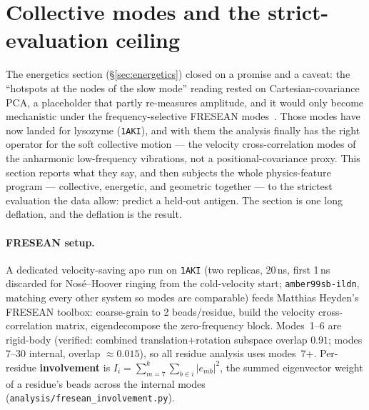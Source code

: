 \section{Collective modes and the strict-evaluation ceiling}\label{sec:modes}

The energetics section (\S\ref{sec:energetics}) closed on a promise and a caveat: the ``hotspots at
the nodes of the slow mode'' reading rested on Cartesian-covariance PCA, a placeholder that partly
re-measures amplitude, and it would only become mechanistic under the frequency-selective FRESEAN
modes~\cite{fresean2023,fastsampling2024}. Those modes have now landed for lysozyme (\texttt{1AKI}), and with them
the analysis finally has the right operator for the soft collective motion --- the velocity
cross-correlation modes of the anharmonic low-frequency vibrations, not a positional-covariance proxy.
This section reports what they say, and then subjects the whole physics-feature program --- collective,
energetic, and geometric together --- to the strictest evaluation the data allow: predict a held-out
antigen. The section is one long deflation, and the deflation is the result.

\paragraph{FRESEAN setup.} A dedicated velocity-saving apo run on \texttt{1AKI} (two replicas, 20\,ns,
first 1\,ns discarded for Nos\'e--Hoover ringing from the cold-velocity start; \texttt{amber99sb-ildn},
matching every other system so modes are comparable) feeds Matthias Heyden's FRESEAN toolbox: coarse-grain
to 2 beads/residue, build the velocity cross-correlation matrix, eigendecompose the zero-frequency block.
Modes~1--6 are rigid-body (verified: combined translation$+$rotation subspace overlap $0.91$; modes 7--30
internal, overlap $\approx0.015$), so all residue analysis uses modes~7+. Per-residue \textbf{involvement}
is $I_i=\sum_{m=7}^{k}\sum_{b\in i}|e_{mb}|^2$, the summed eigenvector weight of a residue's beads across
the internal modes (\texttt{analysis/fresean\_involvement.py}).

